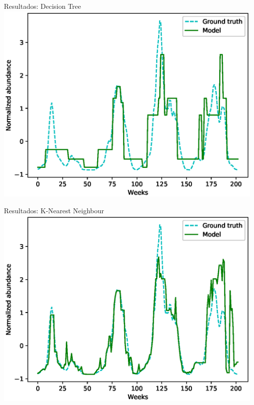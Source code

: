 \documentclass[10pt]{beamer}
\begin{document}
\begin{frame}{Resultados: Decision Tree}
  \includegraphics[width=\textwidth]{dtr.eps}
\end{frame}

\begin{frame}{Resultados: K-Nearest Neighbour}
  \includegraphics[width=\textwidth]{knnr1.eps}
\end{frame}
\end{document}
